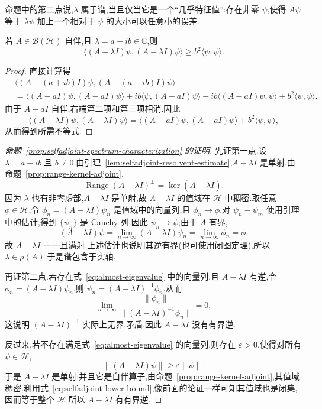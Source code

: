 命题中的第二点说,\(\lambda\) 属于谱,当且仅当它是一个“几乎特征值”:存在非零 \(\psi\),使得 \(A\psi\) 等于 \(\lambda\psi\) 加上一个相对于 \(\psi\) 的大小可以任意小的误差.

\begin{lemma}[自伴算子的下界估计]\label{lem:selfadjoint-resolvent-estimate}
若 \(A\in\mathcal{B}(\mathcal{H})\) 自伴,且 \(\lambda=a+ib\in\mathbb{C}\),则
\[
\langle(A-\lambda I)\psi,(A-\lambda I)\psi\rangle
\geq b^{2}\langle\psi,\psi\rangle.
\label{eq:selfadjoint-resolvent-estimate}
\]
\end{lemma}

\begin{proof}
直接计算得
\begin{align*}
&\langle(A-(a+ib)I)\psi,(A-(a+ib)I)\psi\rangle\\
&=\langle(A-aI)\psi,(A-aI)\psi\rangle
 +ib\langle\psi,(A-aI)\psi\rangle
 -ib\langle(A-aI)\psi,\psi\rangle
 +b^{2}\langle\psi,\psi\rangle.
\end{align*}
由于 \(A-aI\) 自伴,右端第二项和第三项相消.因此
\[
\langle(A-\lambda I)\psi,(A-\lambda I)\psi\rangle
=\langle(A-aI)\psi,(A-aI)\psi\rangle+b^{2}\langle\psi,\psi\rangle,
\]
从而得到所需不等式.
\end{proof}

\begin{proof}[命题~\ref{prop:selfadjoint-spectrum-characterization} 的证明]
先证第一点.设 \(\lambda=a+ib\),且 \(b\neq0\).由引理~\ref{lem:selfadjoint-resolvent-estimate},\(A-\lambda I\) 是单射.由命题~\ref{prop:range-kernel-adjoint},
\[
\operatorname{Range}(A-\lambda I)^{\perp}=\ker(A-\overline{\lambda}I).
\]
因为 \(\overline{\lambda}\) 也有非零虚部,\(A-\overline{\lambda}I\) 是单射,故 \(A-\lambda I\) 的值域在 \(\mathcal{H}\) 中稠密.取任意 \(\phi\in\mathcal{H}\),令 \(\phi_{n}=(A-\lambda I)\psi_{n}\) 是值域中的向量列,且 \(\phi_{n}\to\phi\).对 \(\psi_{n}-\psi_{m}\) 使用引理中的估计,得到 \(\{\psi_{n}\}\) 是 Cauchy 列.因此 \(\psi_{n}\to\psi\);由于 \(A\) 有界,
\[
(A-\lambda I)\psi=\lim_{n\to\infty}(A-\lambda I)\psi_{n}=\lim_{n\to\infty}\phi_{n}=\phi.
\]
故 \(A-\lambda I\) 一一且满射.上述估计也说明其逆有界(也可使用闭图定理),所以 \(\lambda\in\rho(A)\).于是谱包含于实轴.

再证第二点.若存在式~\eqref{eq:almost-eigenvalue} 中的向量列,且 \(A-\lambda I\) 有逆,令 \(\phi_{n}=(A-\lambda I)\psi_{n}\),则 \(\psi_{n}=(A-\lambda I)^{-1}\phi_{n}\),从而
\[
\lim_{n\to\infty}\frac{\|\phi_{n}\|}{\|(A-\lambda I)^{-1}\phi_{n}\|}=0,
\]
这说明 \((A-\lambda I)^{-1}\) 实际上无界,矛盾.因此 \(A-\lambda I\) 没有有界逆.

反过来,若不存在满足式~\eqref{eq:almost-eigenvalue} 的向量列,则存在 \(\varepsilon>0\),使得对所有 \(\psi\in\mathcal{H}\),
\[
\|(A-\lambda I)\psi\|\geq\varepsilon\|\psi\|.
\label{eq:selfadjoint-lower-bound}
\]
于是 \(A-\lambda I\) 是单射;并且它是自伴算子,由命题~\ref{prop:range-kernel-adjoint},其值域稠密.利用式~\eqref{eq:selfadjoint-lower-bound},像前面的论证一样可知其值域也是闭集,因而等于整个 \(\mathcal{H}\).所以 \(A-\lambda I\) 有有界逆.
\end{proof}

